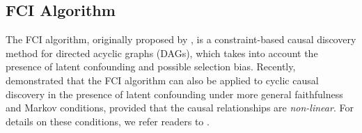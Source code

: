 \documentclass[twoside, 11pt]{article}
\newcommand{\udot}[1]{%
    \tikz[baseline=(todotted.base)]{
        \node[inner sep=1pt,outer sep=0pt] (todotted) {#1};
        \draw[dotted, thick] (todotted.south west) -- (todotted.south east);
    }%
}%
\newcommand{\starcirc}{%
\begin{tikzpicture}
    \draw [{Rays[n=6]}-{Circle[open]}] (0,0) -- (0.55, 0);
\end{tikzpicture}
}
\newcommand{\tailarrow}{%
\begin{tikzpicture}
    \draw [-{Straight Barb[length=2.5pt]}](0,0) -- (0.4, 0);
\end{tikzpicture}
}
\newcommand{\arrowtail}{%
\begin{tikzpicture}
    \draw [{Straight Barb[length=2.5pt]}-](0,0) -- (0.4, 0);
\end{tikzpicture}
}
\newcommand*{\figref}[2][]{%
  \hyperref[{fig:#2}]{%
    Figure~\ref*{fig:#2}%
    \ifx\\#1\\%
    \else
      #1%
    \fi
  }%
}
\begin{document}





\subsection{FCI Algorithm}
The FCI algorithm, originally proposed by \cite{spirtes_causal_1995}, is a constraint-based causal discovery method for directed acyclic graphs (DAGs), which takes into account the presence of latent confounding and possible selection bias. Recently, \citet{mooij_classen2020} demonstrated that the FCI algorithm can also be applied to cyclic causal discovery in the presence of latent confounding under more general faithfulness and Markov conditions, provided that the causal relationships are \textit{non-linear}. For details on these conditions, we refer readers to \citet{forre_markov_2017}. 
\end{document}

